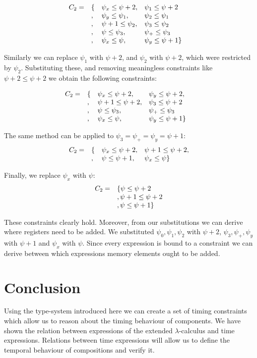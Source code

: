 \[
\begin{array}{l l l l l}
C_2 = & \{ & \psi_x \le \psi + 2, & \psi_1 \le \psi + 2 \\
      &,   & \psi_y \le \psi_1, & \psi_2 \le \psi_1 \\
      &,   & \psi + 1 \le \psi_2, & \psi_3 \le \psi_2\\
      &,   & \psi \le \psi_3, & \psi_+ \le \psi_3 & \\ 
      &,   & \psi_x \le \psi, & \psi_y \le \psi + 1 \}
\end{array}
\]

Similarly we can replace $\psi_1$ with $\psi + 2$, and $\psi_2$ with $\psi + 2$, which were restricted by $\psi_2$.
Substituting these, and removing meaningless constraints like $\psi + 2 \le \psi + 2$ we obtain the following constraints:

\[
\begin{array}{l l l l l}
C_2 = & \{ & \psi_x \le \psi + 2,  & \psi_y \le \psi + 2, \\
      &,   & \psi + 1 \le \psi +2, & \psi_3 \le \psi + 2\\
      &,   & \psi \le \psi_3, & \psi_+ \le \psi_3 & \\ 
      &,   & \psi_x \le \psi, & \psi_y \le \psi + 1 \}
\end{array}
\]

The same method can be applied to $\psi_3 = \psi_+ = \psi_y = \psi + 1$:
\[
\begin{array}{l l l l l}
C_2 = & \{ & \psi_x \le \psi + 2,  & \psi + 1 \le \psi + 2, \\
      &,   & \psi \le \psi + 1,    & \psi_x \le \psi \}
\end{array}
\]

Finally, we replace $\psi_x$ with $\psi$:
\[
\begin{array}{l l}
C_2 = & \{ \psi \le \psi + 2 \\
      & ,  \psi + 1 \le \psi + 2\\
      & ,  \psi \le \psi + 1 \}
\end{array}
\]

These constraints clearly hold. 
Moreover, from our substitutions we can derive where registers need to be added.
We substituted $\psi_0, \psi_1, \psi_2$ with $\psi + 2$, $\psi_3, \psi_+, \psi_y$ with $\psi+1$ and $\psi_x$ with $\psi$.
Since every expression is bound to a constraint we can derive between which expressions memory elements ought to be added.

\section{Conclusion}
Using the type-system introduced here we can create a set of timing constraints which allow us to reason about the timing behaviour of components.
We have shown the relation between expressions of the extended $\lambda$-calculus and time expressions.
Relations between time expressions will allow us to define the temporal behaviour of compositions and verify it.


